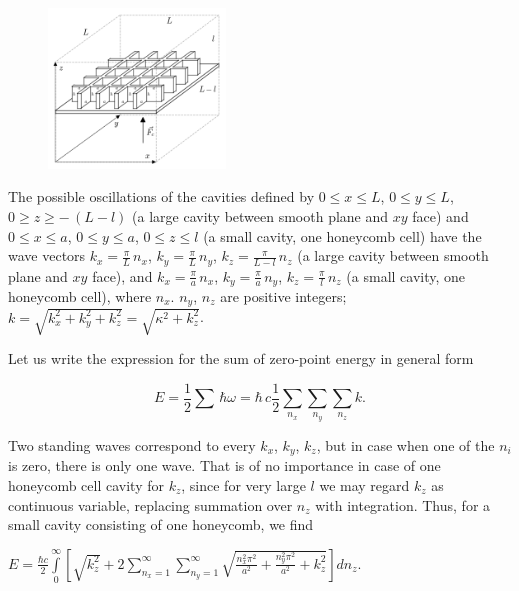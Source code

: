 \documentclass[twoside, 10pt, ptm]{article}
\begin{document}
\begin{multicols}{2}
\begin{figure}
\begin{center}
\includegraphics[width=0.42\textwidth]{honeycomb_box_H.png}
\caption{}{}
\end{center}
\label{fig:honeycomb_box_H}
\end{figure}

    The possible oscillations of the cavities defined by
\(0 \leq x \leq L\), \(0 \leq y \leq L\), \(0 \geq z \geq -\,(L-l)\) (a large cavity between smooth
plane and \(xy\) face)
and
\(0 \leq x \leq a\), \(0 \leq y \leq a\), \(0 \leq z \leq l\) (a small cavity, one honeycomb cell)
    have the wave vectors
\(k_x = \frac{\pi}{L}\,n_x\), \(k_y = \frac{\pi}{L}\,n_y\),
\(k_z = \frac{\pi}{L-l}\,n_z\) (a large cavity between smooth plane and
\(xy\) face),
and
\(k_x = \frac{\pi}{a}\,n_x\), \(k_y = \frac{\pi}{a}\,n_y\),
\(k_z = \frac{\pi}{l}\,n_z\) (a small cavity, one honeycomb cell),
where \(n_x\). \(n_y\), \(n_z\) are positive integers;
\(k = \sqrt{k_x^2+k_y^2+k_z^2} = \sqrt{\kappa^2+k_z^2}\).

Let us write the expression for the sum of zero-point energy in general form

\begin{equation}
E = \frac{1}{2}\sum\,\hbar\omega = \hbar\,c\frac{1}{2}\sum\limits_{n_x}^{}\sum\limits_{n_y}^{}\sum\limits_{n_z}^{}k.
\end{equation}

    Two standing waves correspond to every \(k_x\), \(k_y\), \(k_z\), but in case when
one of the \(n_i\) is zero, there is only one wave. That is of no importance
in case of one honeycomb cell cavity for \(k_z\),
since for very large \(l\) we may regard \(k_z\) as
continuous variable, replacing summation over \(n_z\) with integration.
Thus, for a small cavity consisting of one honeycomb, we find

\noindent
\(E = \frac{\hbar c}{2}\int\limits_{0}^{\infty}\left[{\sqrt{k_z^2}+2\sum\limits_{n_x=1}^{\infty}\sum\limits_{n_y=1}^{\infty}\sqrt{\frac{n_x^2\pi^2}{a^2}+\frac{n_y^2\pi^2}{a^2}+k_z^2}}\right]d{n_z}\).


\end{multicols}
\end{document}
